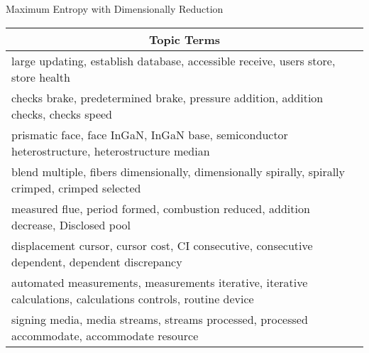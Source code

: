  
\begin{tablehere}
\begin{center}
\caption{Maximum Entropy with Dimensionally Reduction}
\begin{tabular}{| p{} |}
\hline

\multicolumn{1}{|c|}{\textbf{Topic Terms}} \\ \hline
large updating, establish database, accessible receive, users store, store health\\ \hline

checks brake, predetermined brake, pressure addition, addition checks, checks speed\\ \hline	

prismatic face, face InGaN, InGaN base, semiconductor heterostructure, heterostructure median\\ \hline

blend multiple, fibers dimensionally, dimensionally spirally, spirally crimped, crimped selected\\ \hline

measured flue, period formed, combustion reduced, addition decrease, Disclosed pool\\ \hline 

displacement cursor, cursor cost, CI consecutive, consecutive dependent, dependent discrepancy\\ \hline 

automated measurements, measurements iterative, iterative calculations, calculations controls, routine device\\ \hline

signing media, media streams, streams processed, processed accommodate, accommodate resource\\ \hline
\end{tabular}
\end{center}
\end{tablehere}


